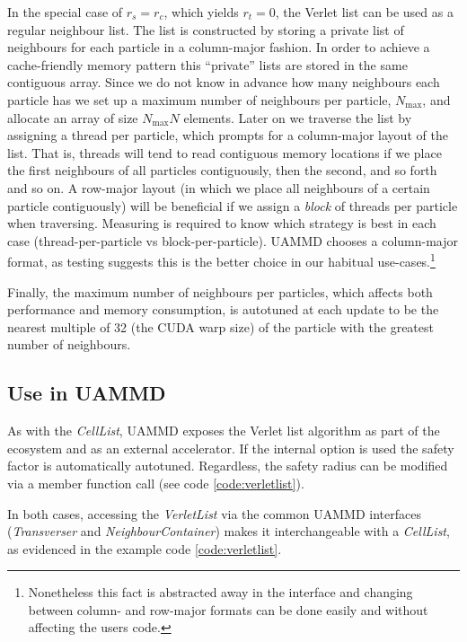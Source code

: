 \documentclass[ twoside,openright,titlepage,numbers=noenddot,%
headinclude,footinclude,cleardoublepage=empty,abstract=on,
BCOR=5mm,paper=b5,fontsize=11pt, dvipsnames
]{scrreprt}
\newcommand{\uammd}{\gls{UAMMD}\xspace}
\begin{document}
In the special case of $r_s=r_c$, which yields $r_t = 0$, the Verlet list can be used as a regular neighbour list.
The list is constructed by storing a private list of neighbours for each particle in a column-major fashion. In order to achieve a cache-friendly memory pattern this ``private'' lists are stored in the same contiguous array. Since we do not know in advance how many neighbours each particle has we set up a maximum number of neighbours per particle, $N_{\text{max}}$, and allocate an array of size $N_{\text{max}}N$ elements. Later on we traverse the list by assigning a thread per particle, which prompts for a column-major layout of the list. That is, threads will tend to read contiguous memory locations if we place the first neighbours of all particles contiguously, then the second, and so forth and so on. A row-major layout (in which we place all neighbours of a certain particle contiguously) will be beneficial if we assign a \emph{block} of threads per particle when traversing.
Measuring is required to know which strategy is best in each case (thread-per-particle vs block-per-particle). UAMMD chooses a column-major format, as testing suggests this is the better choice in our habitual use-cases.\footnote{Nonetheless this fact is abstracted away in the interface and changing between column- and row-major formats can be done easily and without affecting the users code.}

Finally, the maximum number of neighbours per particles, which affects both performance and memory consumption, is autotuned at each update to be the nearest multiple of 32 (the CUDA warp size) of the particle with the greatest number of neighbours.

\subsection*{Use in UAMMD}

As with the \emph{CellList}, \uammd exposes the Verlet list algorithm as part of the ecosystem and as an external accelerator. If the internal option is used the safety factor is automatically autotuned. Regardless, the safety radius can be modified via a member function call (see code \ref{code:verletlist}).

In both cases, accessing the \emph{VerletList} via the common \uammd interfaces (\emph{Transverser} and \emph{NeighbourContainer}) makes it interchangeable with a \emph{CellList}, as evidenced in the example code \ref{code:verletlist}.
\end{document}
